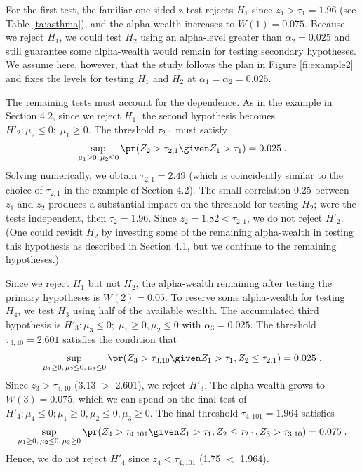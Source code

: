 \documentclass[12pt]{article}
\begin{document}
 For the first test, the familiar one-sided z-test rejects $H_1$ since $z_1 >
 \tau_1 = 1.96$ (see Table \ref{ta:asthma}), and the alpha-wealth increases to
 $W(1) = 0.075$.  Because we reject $H_1$, we could test $H_2$ using an
 alpha-level greater than $\alpha_2 = 0.025$ and still guarantee some
 alpha-wealth would remain for testing secondary hypotheses.  We assume here,
 however, that the study follows the plan in Figure \ref{fi:example2} and fixes
 the levels for testing $H_1$ and $H_2$ at $\alpha_1 = \alpha_2 = 0.025$.


 The remaining tests must account for the dependence.  As in the example in
 Section 4.2, since we reject $H_1$, the second hypothesis becomes $H'_2: \mu_2
 \le 0;\; \mu_1 \ge 0$.  The threshold $\tau_{2,1}$ must satisfy
\begin{displaymath}
  \sup_{\mu_1 \ge 0,\,\mu_2 \le 0} \pr(Z_2 > \tau_{2,1} \given Z_1 > \tau_1)
    = 0.025 \;.
\end{displaymath}
 Solving numerically, we obtain $\tau_{2,1} = 2.49$ (which is coincidently
 similar to the choice of $\tau_{2,1}$ in the example of Section 4.2).  The
 small correlation 0.25 between $z_1$ and $z_2$ produces a substantial impact on
 the threshold for testing $H_2$; were the tests independent, then $\tau_2 =
 1.96$.  Since $z_2 = 1.82 < \tau_{2,1}$, we do not reject $H'_2$.  (One could
 revisit $H_2$ by investing some of the remaining alpha-wealth in testing this
 hypothesis as described in Section 4.1, but we continue to the remaining
 hypotheses.)  

 
 Since we reject $H_1$ but not $H_2$, the alpha-wealth remaining after testing
 the primary hypotheses is $W(2) = 0.05$.  To reserve some alpha-wealth for
 testing $H_4$, we test $H_3$ using half of the available wealth.  The
 accumulated third hypothesis is $H'_3: \mu_3 \le 0;\; \mu_1 \ge 0, \mu_2 \le 0$
 with $\alpha_3 = 0.025$.  The threshold $\tau_{3,10} = 2.601$ satisfies the
 condition that
\begin{displaymath}
 \sup_{\mu_1 \ge 0, \,\mu_2 \le 0,\, \mu_3 \le 0} 
          \pr(Z_3 > \tau_{3,10} \given Z_1 > \tau_1, Z_2 \le \tau_{2,1}) = 0.025 \;.
\end{displaymath}
 Since $z_3 > \tau_{3,10}$ (3.13 $>$ 2.601), we reject $H'_3$.  The alpha-wealth
 grows to $W(3) = 0.075$, which we can spend on the final test of $H'_4: \mu_4
 \le 0; \mu_1 \ge 0, \mu_2 \le 0, \mu_3 \ge 0$.  The final threshold
 $\tau_{4,101} = 1.964$ satisfies
\begin{displaymath}
 \sup_{\mu_1 \ge 0,\, \mu_2 \le 0,\, \mu_3 \ge 0} 
      \pr(Z_4 > \tau_{4,101} \given Z_1 > \tau_1, Z_2 \le \tau_{2,1}, Z_3 
              > \tau_{3,10}) = 0.075\;.
\end{displaymath}
 Hence, we do not reject $H'_4$ since $z_4 < \tau_{4,101}$ (1.75 $<$ 1.964).  
 
\end{document}
